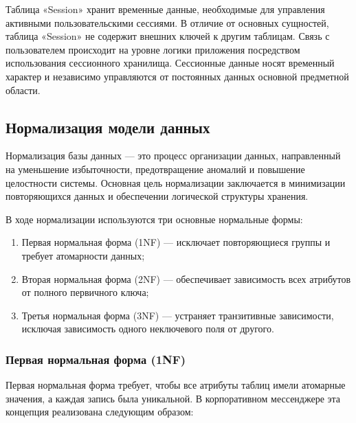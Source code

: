 Таблица «Session» хранит временные данные, необходимые для управления активными пользовательскими сессиями. В отличие от основных сущностей, таблица «Session» не содержит внешних ключей к другим таблицам. Связь с пользователем происходит на уровне логики приложения посредством использования сессионного хранилища. Сессионные данные носят временный характер и независимо управляются от постоянных данных основной предметной области.

\subsection{Нормализация модели данных}

Нормализация базы данных — это процесс организации данных, направленный на уменьшение избыточности, предотвращение аномалий и повышение целостности системы. Основная цель нормализации заключается в минимизации повторяющихся данных и обеспечении логической структуры хранения. 

В ходе нормализации используются три основные нормальные формы:
\begin{enumerate}
	\item Первая нормальная форма (1NF) — исключает повторяющиеся группы и требует атомарности данных;
	\item Вторая нормальная форма (2NF) — обеспечивает зависимость всех атрибутов от полного первичного ключа;
	\item Третья нормальная форма (3NF) — устраняет транзитивные зависимости, исключая зависимость одного неключевого поля от другого.
\end{enumerate}

\subsubsection{Первая нормальная форма (1NF)}

Первая нормальная форма требует, чтобы все атрибуты таблиц имели атомарные значения, а каждая запись была уникальной. В корпоративном мессенджере эта концепция реализована следующим образом:

